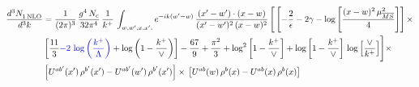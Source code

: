\documentclass[9pt]{article}
\numberwithin{equation}{section}
\begin{document}
\begin{align}
     \frac{d^{3}N_{1\,\rm NLO}^{\rm}}{d^{3}k} &  = \frac{1}{(2\pi)^{3}}\, \frac{g^{4}\,N_{c}}{32\pi^{4}}\,\frac{1}{k^{+}}\, \int_{w, w',x,x',} e^{-ik(w^\prime-w)}\, \frac{(x'-w')\cdot (x-w)}{(x'-w')^{2}\, (x-w)^{2}}\, \Bigg[\left[-\frac{2}{\epsilon}-2\gamma-\log{\left[\frac{(x-w)^{2}\,\mu^{2}_{\overline{MS}}}{4}\right]}\right]\times \notag \\ & \left[\frac{11}{3}{\color{blue}-2\,\log{\left(\frac{k^{+}}{\Lambda}\right)}}+\log{\left(1-\frac{k^{+}}{\vee}\right)}\right]-\frac{67}{9}+\frac{\pi^{2}}{3}+\log^{2}{\left[1-\frac{k^{+}}{\vee}\right]}+\log{\left[1-\frac{k^{+}}{\vee}\right]}\,\log{\left[\frac{\vee}{k^{+}}\right]}\Bigg]\times\notag \\ & \left[U^{ab'}(x')\,\rho^{b'}(x') - U^{ab'}(w')\,\rho^{b'}(x')\right]\times\,\left[U^{ab}(w)\,\rho^{b}(x) - U^{ab}(x)\,\rho^{b}(x)\right]
\end{align}
\end{document}
